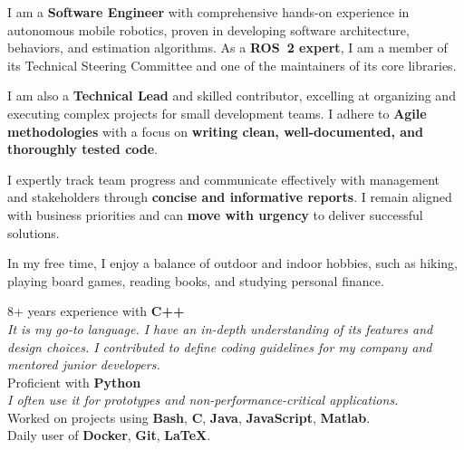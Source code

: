 \documentclass[letterpaper]{soragna-onepage-twocols} %
\begin{document}
\begin{minipage}[t]{0.3\textwidth} %



I am a \textbf{Software Engineer} with comprehensive hands-on experience in autonomous mobile robotics, proven in developing software architecture, behaviors, and estimation algorithms.
As a \textbf{ROS~2 expert}, I am a member of its Technical Steering Committee and one of the maintainers of its core libraries.

I am also a \textbf{Technical Lead} and skilled contributor, excelling at organizing and executing complex projects for small development teams.
I adhere to \textbf{Agile methodologies} with a focus on \textbf{writing clean, well-documented, and thoroughly tested code}.

I expertly track team progress and communicate effectively with management and stakeholders through \textbf{concise and informative reports}.
I remain aligned with business priorities and can \textbf{move with urgency} to deliver successful solutions.

In my free time, I enjoy a balance of outdoor and indoor hobbies, such as hiking, playing board games, reading books, and studying personal finance.

\sectionspace %



8+ years experience with \textbf{C++}\\
{\emph{It is my go-to language.
I have an in-depth understanding of its features and design choices.
I contributed to define coding guidelines for my company and mentored junior developers.}}\\
Proficient with \textbf{Python}\\
{\emph{I often use it for prototypes and non-performance-critical applications.}}\\
Worked on projects using \textbf{Bash}, \textbf{C}, \textbf{Java}, \textbf{JavaScript},  \textbf{Matlab}.\\
Daily user of \textbf{Docker}, \textbf{Git}, \textbf{LaTeX}.\\


\end{minipage}
\end{document}
